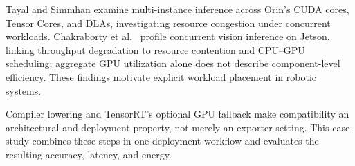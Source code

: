Tayal and Simmhan \cite{tayal2024multiinstance} examine multi-instance inference
across Orin's CUDA cores, Tensor Cores, and DLAs, investigating resource
congestion under concurrent workloads. Chakraborty et al.\
\cite{chakraborty2025profiling} profile concurrent vision inference on Jetson,
linking throughput degradation to resource contention and CPU--GPU scheduling;
aggregate GPU utilization alone does not describe component-level efficiency.
These findings motivate explicit workload placement in robotic systems.

Compiler lowering \cite{chen2018tvm} and TensorRT's optional GPU fallback
\cite{nvidia_dla_working} make compatibility an architectural and deployment
property, not merely an exporter setting. This case study combines these steps in one deployment workflow and evaluates the resulting accuracy, latency, and energy.
